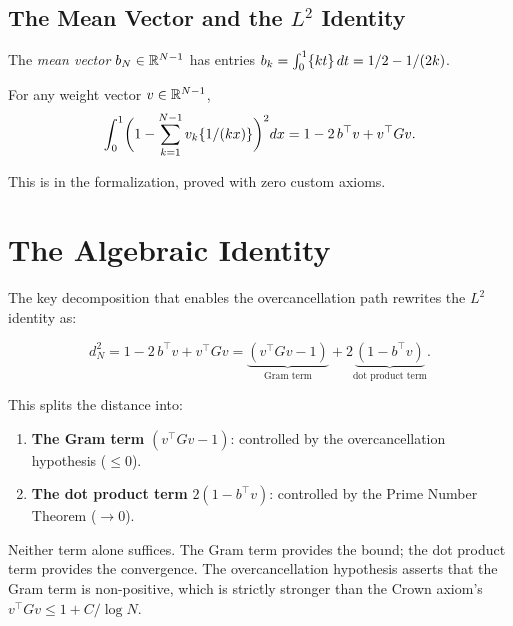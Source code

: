 \documentclass[11pt,a4paper]{article}
\begin{document}
\subsection{The Mean Vector and the $L^2$ Identity}

\begin{definition}
The \emph{mean vector} $b_N \in \mathbb{R}^{N-1}$ has entries
$b_k = \int_0^1 \{kt\}\,dt = 1/2 - 1/(2k)$.
\end{definition}

\begin{theorem}
\label{thm:l2identity}
For any weight vector $v \in \mathbb{R}^{N-1}$,
\[
  \int_0^1 \biggl(1 - \sum_{k=1}^{N-1} v_k \{1/(kx)\}\biggr)^2 dx
  = 1 - 2\,b^\top v + v^\top G v.
\]
\end{theorem}

\noindent
This is  in the formalization,
proved with zero custom axioms.

\section{The Algebraic Identity}
\label{sec:identity}

The key decomposition that enables the overcancellation path
rewrites the $L^2$ identity as:

\begin{equation}
\label{eq:decomposition}
  d_N^2 = 1 - 2\,b^\top v + v^\top G v
        = \underbrace{(v^\top G v - 1)}_{\text{Gram term}}
          + 2\underbrace{(1 - b^\top v)}_{\text{dot product term}}.
\end{equation}

This splits the distance into:
\begin{enumerate}
  \item \textbf{The Gram term} $(v^\top G v - 1)$: controlled by
    the overcancellation hypothesis ($\leq 0$).
  \item \textbf{The dot product term} $2(1 - b^\top v)$: controlled
    by the Prime Number Theorem ($\to 0$).
\end{enumerate}

Neither term alone suffices. The Gram term provides the bound; the
dot product term provides the convergence. The overcancellation
hypothesis asserts that the Gram term is non-positive, which is
strictly stronger than the Crown axiom's $v^\top G v \leq 1 + C/\log N$.
\end{document}
